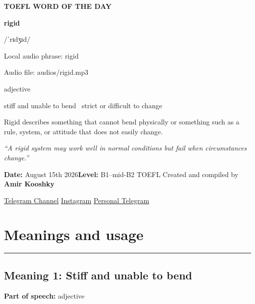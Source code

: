 \documentclass[11pt]{article}
\newcommand{\sectionrule}{\par\vspace{-0.5em}\noindent\textcolor{Accent}{\rule{\linewidth}{0.6pt}}\par}
\begin{document}
\begin{center}
{\sffamily\bfseries\color{Accent} TOEFL WORD OF THE DAY\par}
\vspace{8mm}
{\fontsize{42}{48}\selectfont\bfseries rigid\par}
\vspace{2mm}
{\Large\sffamily\color{Accent} /ˈrɪdʒɪd/\par}
\vspace{2mm}
{\small\sffamily Local audio phrase: rigid\par}
{\small\sffamily Audio file: audios/rigid.mp3\par}
\vspace{2mm}
{\large\sffamily\color{Muted} adjective\par}
\vspace{5mm}
{\sffamily stiff and unable to bend \textbullet\ strict or difficult to change\par}
\vspace{6mm}
{\large Rigid describes something that cannot bend physically or something such as a rule, system, or attitude that does not easily change.\par}
\vspace{6mm}
\begin{minipage}{0.84\textwidth}
\itshape “A rigid system may work well in normal conditions but fail when circumstances change.”
\end{minipage}\par
\vspace{10mm}
\textbf{Date:} August 15th 2026\quad\textbullet\quad \textbf{Level:} B1--mid-B2 TOEFL
\vfill
Created and compiled by \textbf{Amir Kooshky}\par
\vspace{2mm}
\href{https://t.me/KooshkyTOEFL}{Telegram Channel}\quad\textbullet\quad
\href{https://www.instagram.com/kooshkytoefl}{Instagram}\quad\textbullet\quad
\href{https://t.me/KooshkyTOEFL\_pv}{Personal Telegram}
\end{center}
\newpage
\tableofcontents
\newpage

\section{Meanings and usage}
\sectionrule
\subsection{Meaning 1: Stiff and unable to bend}
\textbf{Part of speech:} adjective
\end{document}
